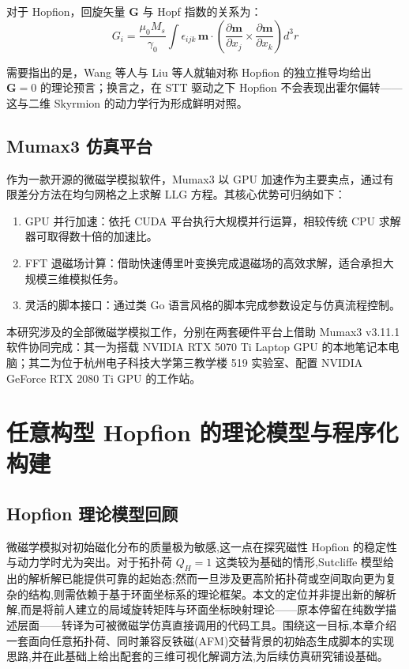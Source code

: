 \documentclass{article}
\begin{document}
对于 Hopfion，回旋矢量 $\mathbf{G}$ 与 Hopf 指数的关系为\cite{liu2020three}：
\begin{equation}
  G_i = \frac{\mu_0 M_s}{\gamma_0} \int \epsilon_{ijk} \, \mathbf{m} \cdot \left( \frac{\partial \mathbf{m}}{\partial x_j} \times \frac{\partial \mathbf{m}}{\partial x_k} \right) d^3r
  \label{eq:gyrovector}
\end{equation}

需要指出的是，Wang 等人\cite{wang2019current}与 Liu 等人\cite{liu2020three}就轴对称 Hopfion 的独立推导均给出 $\mathbf{G} = 0$ 的理论预言；换言之，在 STT 驱动之下 Hopfion 不会表现出霍尔偏转——这与二维 Skyrmion 的动力学行为形成鲜明对照。


\section{Mumax3 仿真平台}

作为一款开源的微磁学模拟软件\cite{vansteenkiste2014design}，Mumax3 以 GPU 加速作为主要卖点，通过有限差分方法在均匀网格之上求解 LLG 方程。其核心优势可归纳如下：

\begin{enumerate}[label=(\arabic*)]
  \item GPU 并行加速：依托 CUDA 平台执行大规模并行运算，相较传统 CPU 求解器可取得数十倍的加速比。
  \item FFT 退磁场计算：借助快速傅里叶变换完成退磁场的高效求解，适合承担大规模三维模拟任务。
  \item 灵活的脚本接口：通过类 Go 语言风格的脚本完成参数设定与仿真流程控制。
\end{enumerate}

本研究涉及的全部微磁学模拟工作，分别在两套硬件平台上借助 Mumax3 v3.11.1 软件协同完成：其一为搭载 NVIDIA RTX 5070 Ti Laptop GPU 的本地笔记本电脑；其二为位于杭州电子科技大学第三教学楼 519 实验室、配置 NVIDIA GeForce RTX 2080 Ti GPU 的工作站。

\chapter{任意构型 Hopfion 的理论模型与程序化构建}

\section{Hopfion 理论模型回顾}

微磁学模拟对初始磁化分布的质量极为敏感,这一点在探究磁性 Hopfion 的稳定性与动力学时尤为突出。对于拓扑荷 $Q_H=1$ 这类较为基础的情形,Sutcliffe 模型给出的解析解已能提供可靠的起始态;然而一旦涉及更高阶拓扑荷或空间取向更为复杂的结构,则需依赖于基于环面坐标系的理论框架\cite{guslienko2025magnetic}。本文的定位并非提出新的解析解,而是将前人建立的局域旋转矩阵与环面坐标映射理论——原本停留在纯数学描述层面——转译为可被微磁学仿真直接调用的代码工具。围绕这一目标,本章介绍一套面向任意拓扑荷、同时兼容反铁磁(AFM)交替背景的初始态生成脚本的实现思路,并在此基础上给出配套的三维可视化解调方法,为后续仿真研究铺设基础。
\end{document}
